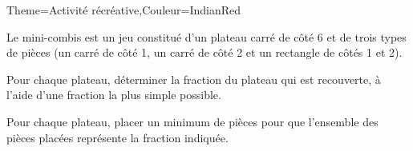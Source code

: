 \begin{Maquette}[Cours]{Theme={Activité récréative},Couleur={IndianRed}}
    
      Le mini-combis est un jeu constitué d'un plateau carré de côté 6 et de trois types de pièces (un carré de côté 1, un carré de côté 2 et un rectangle de côtés 1 et 2).

         Pour chaque plateau, déterminer la fraction du plateau qui est recouverte, à l'aide d'une fraction la plus simple possible. \par \medskip

      \vfill

         Pour chaque plateau, placer un minimum de pièces pour que l'ensemble des pièces placées représente la fraction indiquée. \par \medskip

         \vskip8mm



\end{Maquette}
